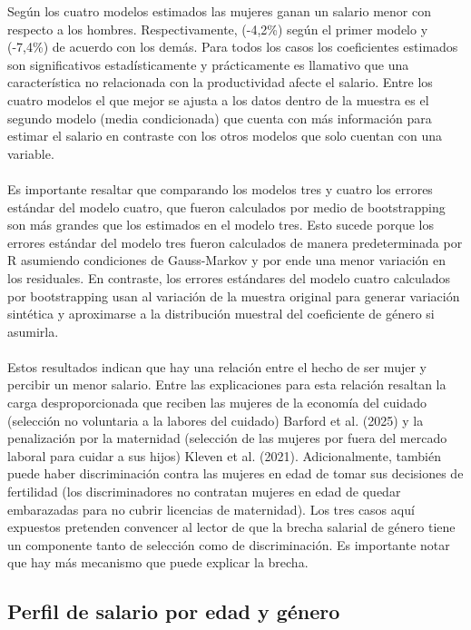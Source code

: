 \documentclass[article,11 pt]{article}
\begin{document}
Según los cuatro modelos estimados las mujeres ganan un salario menor con respecto a los hombres. Respectivamente, (-4,2\%) según el primer modelo  y (-7,4\%) de acuerdo con los demás. Para todos los casos los coeficientes estimados son significativos estadísticamente y prácticamente es llamativo que una característica no relacionada con la productividad afecte el salario. Entre los cuatro modelos el que mejor se ajusta a los datos dentro de la muestra es el segundo modelo (media condicionada) que cuenta con más información para estimar el salario en contraste con los otros modelos que solo cuentan con una variable. 
\\
\\
Es importante resaltar que comparando los modelos tres y cuatro los errores estándar del modelo cuatro, que fueron calculados por medio de bootstrapping son más grandes que los estimados en el modelo tres. Esto sucede porque los errores estándar del modelo tres fueron calculados de manera predeterminada por R asumiendo condiciones de Gauss-Markov y por ende una menor variación en los residuales. En contraste, los errores estándares del modelo cuatro calculados por bootstrapping usan al variación de la muestra original para generar variación sintética y aproximarse a la distribución muestral del coeficiente de género si asumirla. 
\\
\\
Estos resultados indican que hay una relación entre el hecho de ser mujer y percibir un menor salario. Entre las explicaciones para esta relación resaltan la carga desproporcionada que reciben las mujeres de la economía del cuidado (selección no voluntaria a la labores del cuidado) Barford et al. (2025)  y la penalización por la maternidad (selección de las mujeres por fuera del mercado laboral para cuidar a sus hijos) Kleven et al. (2021). Adicionalmente, también puede haber discriminación contra las mujeres en edad de tomar sus decisiones de fertilidad (los discriminadores no contratan mujeres en edad de quedar embarazadas para no cubrir licencias de maternidad). Los tres casos aquí expuestos pretenden convencer al lector de que la brecha salarial de género tiene un componente tanto de selección como de discriminación. Es importante notar que hay más mecanismo que puede explicar la brecha.

\subsection{Perfil de salario por edad y género}
\end{document}
